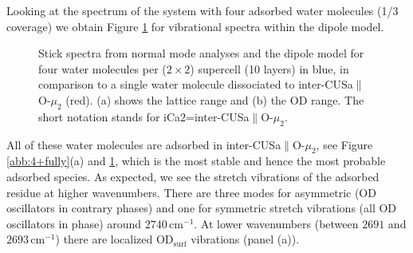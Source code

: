 \documentclass[11pt,DIV=13,BCOR=5mm,a4paper,headinclude]{scrbook}
\begin{document}
Looking at the spectrum of the system with four adsorbed water molecules (1/3 coverage) we obtain Figure \ref{abb:4water} for vibrational spectra within the dipole model.
\begin{figure}[!h]
    \centering
             \quad
             \quad
             \caption{Stick spectra from normal mode analyses and the dipole model for four water molecules per ($2\times 2$) supercell (10 layers) in blue, in comparison to a single water molecule dissociated to inter-CUSa$\parallel$O-$\mu_2$ (red).
(a) shows the lattice range and (b) the OD range.
The short notation stands for iCa2=inter-CUSa$\parallel$O-$\mu_2$.}
            \label{abb:4water}
\end{figure}
All of these water molecules are adsorbed in inter-CUSa$\parallel$O-$\mu_2$, see Figure \ref{abb:4+fully}(a) and \ref{abb:4water}, which is the most stable and hence the most probable adsorbed species.
As expected, we see the stretch vibrations of the adsorbed residue at higher wavenumbers.
There are three modes for asymmetric (OD oscillators in contrary phases) and one for symmetric stretch vibrations (all OD oscillators in phase) around $2740\,$cm$^{-1}$.
At lower wavenumbers (between $2691$ and $2693\,$cm$^{-1}$) there are localized OD$_\textrm{surf}$ vibrations (panel (a)).
\end{document}
